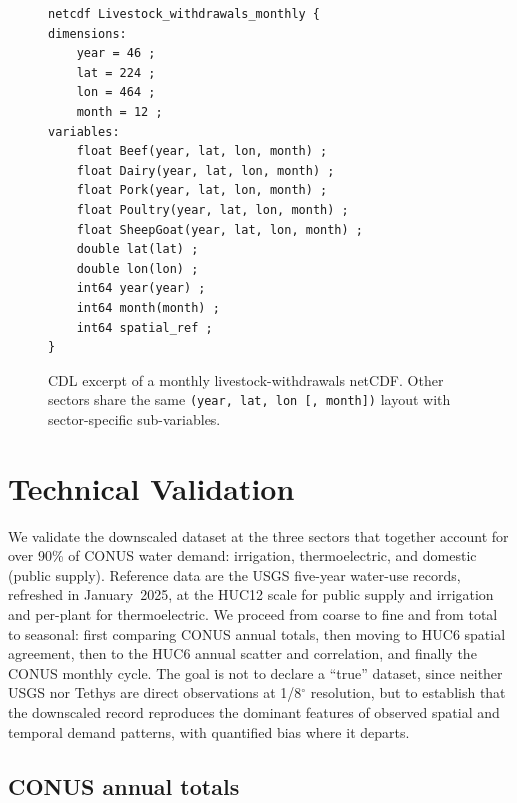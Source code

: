 \documentclass[fleqn,10pt]{wlscirep}
\begin{document}
\begin{figure}[ht]
\centering
\begin{verbatim}
netcdf Livestock_withdrawals_monthly {
dimensions:
    year = 46 ;
    lat = 224 ;
    lon = 464 ;
    month = 12 ;
variables:
    float Beef(year, lat, lon, month) ;
    float Dairy(year, lat, lon, month) ;
    float Pork(year, lat, lon, month) ;
    float Poultry(year, lat, lon, month) ;
    float SheepGoat(year, lat, lon, month) ;
    double lat(lat) ;
    double lon(lon) ;
    int64 year(year) ;
    int64 month(month) ;
    int64 spatial_ref ;
}
\end{verbatim}
\caption{CDL excerpt of a monthly livestock-withdrawals netCDF. Other sectors share the same \texttt{(year, lat, lon [, month])} layout with sector-specific sub-variables.}
\label{fig:data-listing}
\end{figure}

\section*{Technical Validation}

We validate the downscaled dataset at the three sectors that together account for over 90\% of CONUS water demand: irrigation, thermoelectric, and domestic (public supply)\cite{skinnerWaterWithdrawalConsumption2025}. Reference data are the USGS five-year water-use records, refreshed in January~2025, at the HUC12 scale for public supply and irrigation and per-plant for thermoelectric. We proceed from coarse to fine and from total to seasonal: first comparing CONUS annual totals, then moving to HUC6 spatial agreement, then to the HUC6 annual scatter and correlation, and finally the CONUS monthly cycle. The goal is not to declare a ``true'' dataset, since neither USGS nor Tethys are direct observations at 1/8$^{\circ}$ resolution, but to establish that the downscaled record reproduces the dominant features of observed spatial and temporal demand patterns, with quantified bias where it departs.

\subsection*{CONUS annual totals}
\end{document}
